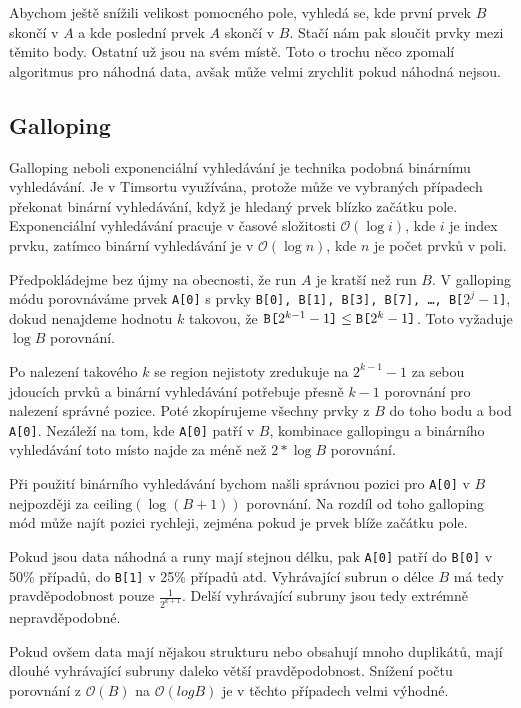 \documentclass[thesis=B,czech]{FITthesis}[2019/12/23]
\begin{document}
Abychom ještě snížili velikost pomocného pole, vyhledá se, kde první prvek $ B $ skončí v $ A $ a kde poslední prvek $ A $ skončí v  $ B $. Stačí nám pak sloučit prvky mezi těmito body. Ostatní už jsou na svém místě. Toto o trochu něco zpomalí algoritmus pro náhodná data, avšak může velmi zrychlit pokud náhodná nejsou. 


\subsection{Galloping}

Galloping neboli exponenciální vyhledávání je technika podobná binárnímu vyhledávání. Je v Timsortu využívána, protože může ve vybraných případech překonat binární vyhledávání, když je hledaný prvek blízko začátku pole. Exponenciální vyhledávání pracuje v časové složitosti $ \mathcal{O}(\log{i}) $, kde $ i $ je index prvku, zatímco binární vyhledávání je v $ \mathcal{O}(\log{n}) $, kde $ n $ je počet prvků v poli.\cite{exponentialsearch}

Předpokládejme bez újmy na obecnosti, že run $ A $ je kratší než run $ B $. V galloping módu porovnáváme prvek \texttt{A[0]} s prvky \texttt{B[0], B[1], B[3], B[7], \ldots, B[$ 2^j - 1 $]}, dokud nenajdeme hodnotu $ k $ takovou, že $ \texttt{B[$ 2^{k-1} - 1 $]} \le \texttt{B[$ 2^k - 1 $]} $. Toto vyžaduje $ \log{B} $ porovnání.

Po nalezení takového $ k $ se region nejistoty zredukuje na $ 2^{k-1}-1 $ za sebou jdoucích prvků a binární vyhledávání potřebuje přesně $ k-1 $ porovnání pro nalezení správné pozice. Poté zkopírujeme všechny prvky z $ B $ do toho bodu a bod \texttt{A[0]}. Nezáleží na tom, kde \texttt{A[0]} patří v $ B $, kombinace gallopingu a binárního vyhledávání toto místo najde za méně než $ 2*\log{B} $ porovnání.

Při použití binárního vyhledávání bychom našli správnou pozici pro \texttt{A[0]} v $ B $ nejpozději za $ \textrm{ceiling}(\log{(B + 1)}) $ porovnání. Na rozdíl od toho galloping mód může najít pozici rychleji, zejména pokud je prvek blíže začátku pole.

Pokud jsou data náhodná a runy mají stejnou délku, pak \texttt{A[0]} patří do \texttt{B[0]} v 50\% případů, do \texttt{B[1]} v 25\% případů atd. Vyhrávající subrun o délce $B$ má tedy pravděpodobnost pouze $ \frac{1}{2^{k+1}} $. Delší vyhrávající subruny jsou tedy extrémně nepravděpodobné.


Pokud ovšem data mají nějakou strukturu nebo obsahují mnoho duplikátů, mají dlouhé vyhrávající subruny daleko větší pravděpodobnost. Snížení počtu porovnání z $ \mathcal{O}(B) $ na $ \mathcal{O}(log{} B) $ je v těchto případech velmi výhodné.
\end{document}
